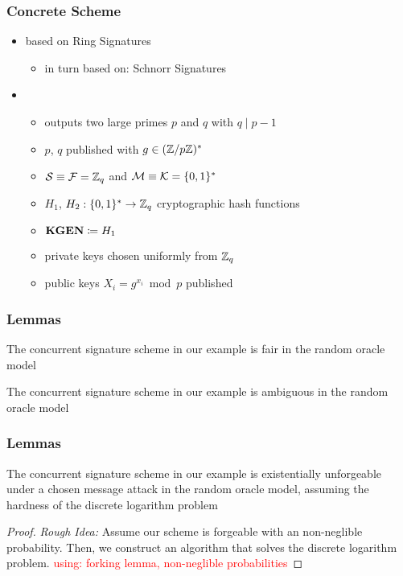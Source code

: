 \begin{frame}
	\frametitle{Concrete Scheme}

	\begin{itemize}[<+->]
		\item based on Ring Signatures
			\begin{itemize}
				\item in turn based on: Schnorr Signatures
			\end{itemize}
		\item \setup 
		\begin{itemize}
			\item outputs two large primes $p$ and $q$ with $q \mid p-1$
			\item $p$, $q$ published with $g\in(\mathbb{Z}/p\mathbb{Z})^\ast$
			\item $\mathcal{S} \equiv \mathcal{F} = \mathbb{Z}_q$ and $\mathcal{M} \equiv \mathcal{K} = \{0,1\}^\ast$
			\item $H_1$, $H_2: \{0,1\}^\ast \to \mathbb{Z}_q$ cryptographic hash functions 
			\item $\textbf{KGEN} \coloneqq H_1$
			\item private keys chosen uniformly from $\mathbb{Z}_q$
			\item public keys $X_i = g^{x_i} \bmod p$ published
		\end{itemize}
	\end{itemize}
\end{frame}

\begin{frame}
	\frametitle{Lemmas}

	\begin{lemma}[Fairness]
		The concurrent signature scheme in our example is fair in the random oracle model
	\end{lemma}

	\begin{lemma}[Ambiguity]
		The concurrent signature scheme in our example is ambiguous in the random oracle model
	\end{lemma}	
\end{frame}

\begin{frame}
	\frametitle{Lemmas}

	\begin{lemma}[Unforgeability]
		The concurrent signature scheme in our example is existentially unforgeable under a chosen message attack in the random oracle model, assuming the hardness of the discrete logarithm problem
	\end{lemma}	
	\begin{proof}
		\textit{Rough Idea:} Assume our scheme is forgeable with an non-neglible probability. 
		Then, we construct an algorithm that solves the discrete logarithm problem.
		\textcolor{red}{using: forking lemma, non-neglible probabilities}
	\end{proof}
\end{frame}